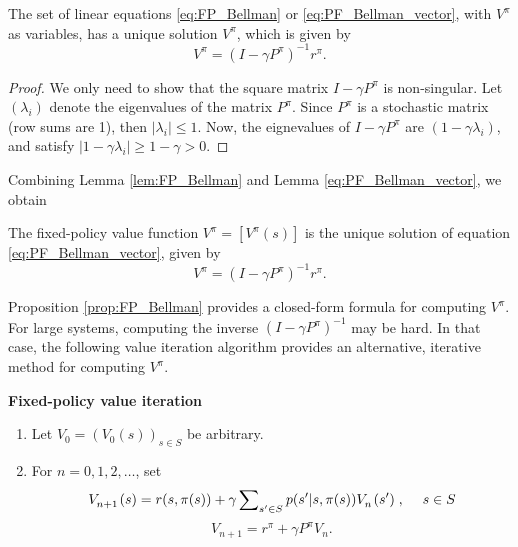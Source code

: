 \begin{lemma}\label{lem:FP_Bellman_sol} The set of linear equations \eqref{eq:FP_Bellman} or \eqref{eq:PF_Bellman_vector}, with ${V^\pi }$ as variables, has a unique solution ${V^\pi }$, which is given by \[{V^\pi } = {(I - \gamma {P^\pi })^{ - 1}}{r^\pi }.\]
\end{lemma}
\begin{proof} We only need to show that the square matrix $I - \gamma {P^\pi }$ is non-singular.  Let $({\lambda _i})$ denote the eigenvalues of the matrix ${P^\pi }$. Since ${P^\pi }$ is a stochastic matrix (row sums are 1), then $|{\lambda _i}| \le 1$. Now, the eignevalues of $I - \gamma {P^\pi }$ are $(1 - \gamma {\lambda _i})$, and satisfy $|1 - \gamma {\lambda _i}| \ge 1 - \gamma  > 0$.                                                                                                            \end{proof}

Combining Lemma \ref{lem:FP_Bellman} and Lemma \ref{eq:PF_Bellman_vector}, we obtain

\begin{proposition}\label{prop:FP_Bellman} The fixed-policy value function ${V^\pi } = [{V^\pi }(s)]$ is the unique solution of equation \eqref{eq:PF_Bellman_vector}, given by \[{V^\pi } = {(I - \gamma {P^\pi })^{ - 1}}{r^\pi }.\]
\end{proposition}

Proposition \ref{prop:FP_Bellman} provides a closed-form formula for computing $V_{}^\pi$. For large systems, computing the inverse ${(I - \gamma {P^\pi })^{ - 1}}$ may be hard.  In that case, the following value iteration algorithm provides an alternative, iterative method for computing $V_{}^\pi$.

\begin{algorithm_}\textbf{Fixed-policy value iteration}
\begin{enumerate}
  \item Let ${V_0} = {({V_0}(s))_{s \in S}}$ be arbitrary.
  \item For $n = 0,1,2, \ldots $, set
\[V_{n + 1}^{}{\kern 1pt} (s) = r(s,\pi (s)) + \gamma \sum\nolimits_{s' \in S} {p(s'|s,\pi (s))V_n^{}{\kern 1pt} (s')} \;,\quad \;s \in S\]
\[{V_{n + 1}} = {r^\pi } + \gamma {P^\pi }{V_n}.\]
\end{enumerate}
\end{algorithm_}

